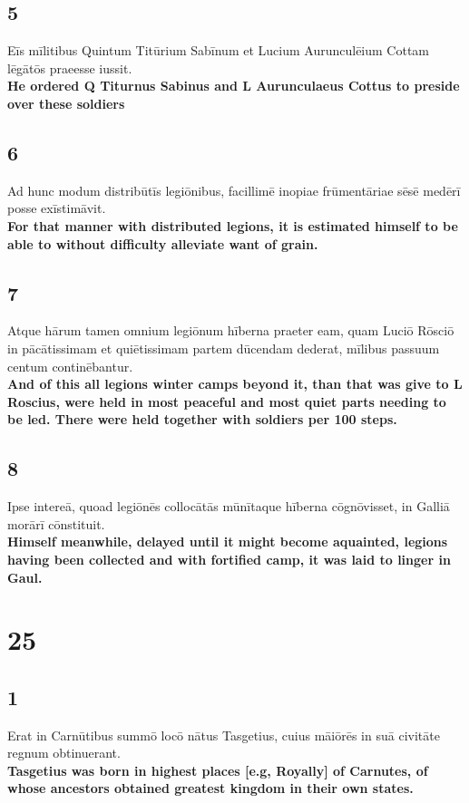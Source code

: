 \documentclass{article}
\begin{document}
\subsection*{5}
Eīs mīlitibus Quintum Titūrium Sabīnum et Lucium Aurunculēium Cottam lēgātōs praeesse iussit. \\
\textbf{He ordered Q Titurnus Sabinus and L Aurunculaeus Cottus to preside over these soldiers}

\subsection*{6}
Ad hunc modum distribūtīs legiōnibus, facillimē inopiae frūmentāriae sēsē medērī posse exīstimāvit.\\
\textbf{For that manner with distributed legions, it is estimated himself to be able to without difficulty alleviate want of grain.}

\subsection*{7}
Atque hārum tamen omnium legiōnum hīberna praeter eam, quam Luciō Rōsciō in pācātissimam et quiētissimam partem dūcendam dederat, mīlibus passuum centum continēbantur.\\
\textbf{And of this all legions winter camps beyond it, than that was give to L Roscius, were held in most peaceful and most quiet parts needing to be led. There were held together with soldiers per 100 steps.}

\subsection*{8}
Ipse intereā, quoad legiōnēs collocātās mūnītaque hīberna cōgnōvisset, in Galliā morārī cōnstituit. \\
\textbf{Himself meanwhile, delayed until it might become aquainted, legions having been collected and with fortified camp, it was laid to linger in Gaul.}


\section*{25}
\subsection*{1}
Erat in Carnūtibus summō locō nātus Tasgetius, cuius māiōrēs in suā civitāte regnum obtinuerant.\\
\textbf{Tasgetius was born in highest places [e.g, Royally] of Carnutes, of whose ancestors obtained greatest kingdom in their own states.}
\end{document}
